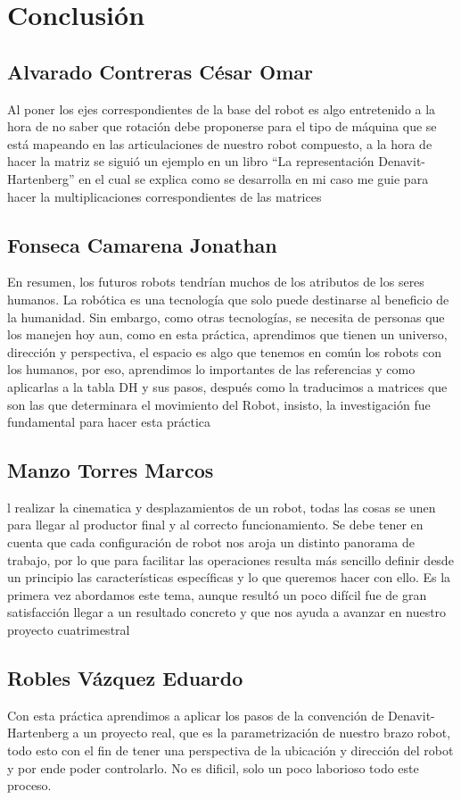 \documentclass[11pt,a4paper,oldfontcommands,oneside]{memoir}
\begin{document}
\chapter{Conclusión}
\section{Alvarado Contreras César Omar}
Al poner los ejes correspondientes de la base del robot es algo entretenido a la hora de no saber que rotación debe proponerse para el tipo de máquina que se está mapeando en las articulaciones de nuestro robot compuesto, a la hora de hacer la matriz se siguió un ejemplo en un libro “La representación Denavit-Hartenberg” en el cual se explica como se desarrolla en mi caso me guie para hacer la multiplicaciones correspondientes de las matrices 
\section{Fonseca Camarena Jonathan}
En resumen, los futuros robots tendrían muchos de los atributos de los seres humanos. La robótica es una tecnología que solo puede destinarse al beneficio de la humanidad. Sin embargo, como otras tecnologías, se necesita de personas que los manejen hoy aun, como en esta práctica, aprendimos que tienen un universo, dirección y perspectiva, el espacio es algo que tenemos en común los robots con los humanos, por eso, aprendimos lo importantes de las referencias y como aplicarlas a la tabla DH y sus pasos, después como la traducimos a matrices que son las que determinara el movimiento del Robot, insisto, la investigación fue fundamental para hacer esta práctica
\section{Manzo Torres Marcos}
l realizar la cinematica y desplazamientos de un robot, todas las cosas se unen para llegar al productor final y al correcto funcionamiento. Se debe tener en cuenta que cada configuración de robot nos aroja un distinto panorama de trabajo, por lo que para facilitar las operaciones resulta más sencillo definir desde un principio las características específicas y lo que queremos hacer con ello. Es la primera vez abordamos este tema, aunque resultó un poco difícil fue de gran satisfacción llegar a un resultado concreto y que nos ayuda a avanzar en nuestro proyecto cuatrimestral
\section{Robles Vázquez Eduardo}
Con esta práctica aprendimos a aplicar los pasos de la convención de Denavit-Hartenberg a un proyecto real, que es la parametrización de nuestro brazo robot, todo esto con el fin de tener una perspectiva de la ubicación y dirección del robot y por ende poder controlarlo. No es dificil, solo un poco laborioso todo este proceso.
\end{document}
